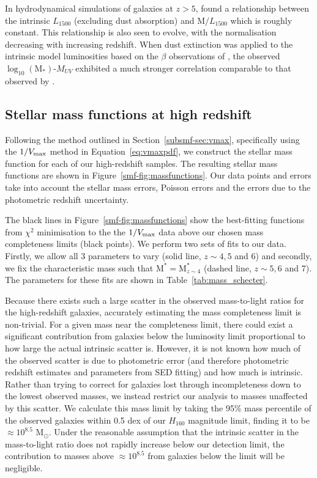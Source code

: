 In hydrodynamical simulations of galaxies at $z > 5$, \citet{Wilkins:2013kh} found a relationship between the intrinsic $L_{1500}$ (excluding dust absorption) and $\text{M}/L_{1500}$ which is roughly constant. This relationship is also seen to evolve, with the normalisation decreasing with increasing redshift. When dust extinction was applied to the intrinsic model luminosities based on the $\beta$ observations of \citet{2012ApJ...754...83B}, the observed $\log_{10} (\text{M}_{*})$-$M_{UV}$ exhibited a much stronger correlation comparable to that observed by \citet{Gonzalez:2011dn}.


\subsection{Stellar mass functions at high redshift}\label{smf-sec:smf}
Following the method outlined in Section~\ref{subsmf-sec:vmax}, specifically using the $1/V_{\rm{max}}$ method in Equation~\ref{eq:vmaxpdf}, we construct the stellar mass function for each of our high-redshift samples. The resulting stellar mass functions are shown in Figure~\ref{smf-fig:massfunctions}. Our data points and errors take into account the stellar mass errors, Poisson errors and the errors due to the photometric redshift uncertainty.

The black lines in Figure~\ref{smf-fig:massfunctions} show the best-fitting \citet{Schechter:1976gl} functions from $\chi^2$ minimisation to the the $1/V_{\rm{max}}$ data above our chosen mass completeness limits (black points). We perform two sets of fits to our data. Firstly, we allow all 3 parameters to vary (solid line, $z\sim 4, 5$ and 6) and secondly, we fix the characteristic mass such that $\text{M}^{*} = \text{M}_{z\sim4}^{*}$ (dashed line, $z\sim 5, 6$ and 7). The parameters for these fits are shown in Table~\ref{tab:mass_schecter}. 

Because there exists such a large scatter in the observed mass-to-light ratios for the high-redshift galaxies, accurately estimating the mass completeness limit is non-trivial. For a given mass near the completeness limit, there could exist a significant contribution from galaxies below the luminosity limit proportional to how large the actual intrinsic scatter is. However, it is not known how much of the observed scatter is due to photometric error (and therefore photometric redshift estimates and parameters from SED fitting) and how much is intrinsic.
Rather than trying to correct for galaxies lost through incompleteness down to the lowest observed masses, we instead restrict our analysis to masses unaffected by this scatter. We calculate this mass limit by taking the 95\% mass percentile of the observed galaxies within 0.5 dex of our $H_{160}$ magnitude limit, finding it to be $\approx 10^{8.5}$ M$_{\odot}$. Under the reasonable assumption that the intrinsic scatter in the mass-to-light ratio does not rapidly increase below our detection limit, the contribution to masses above $\approx 10^{8.5}$ from galaxies below the limit will be negligible.

